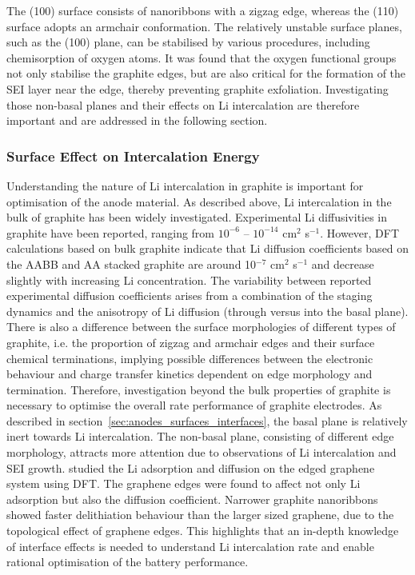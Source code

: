 \documentclass[../main.tex]{subfiles}
\begin{document}
The (100) surface consists of nanoribbons with a zigzag edge, whereas the (110) surface adopts an armchair conformation. The relatively unstable surface planes, such as the (100) plane, can be stabilised by various procedures, including chemisorption of oxygen atoms.\cite{Rosanna} It was found that the oxygen functional groups not only stabilise the graphite edges, but are also critical for the formation of the SEI layer near the edge, thereby preventing graphite exfoliation.\cite{bernardo2015influence} Investigating those non-basal planes and their effects on Li intercalation are therefore important and are addressed in the following section.

\subsubsection{Surface Effect on Intercalation Energy} 
Understanding the nature of Li intercalation in graphite is important for optimisation of the anode material. As described above, Li intercalation in the bulk of graphite has been widely investigated.\cite{persson2010,toyoura2008first,toyoura2010effects,yao2012diffusion,thinius2014theoretical} Experimental Li diffusivities in graphite have been reported, ranging from $10^{-6}$ -- $10^{-14}$ cm$^2$ s$^{-1}$.\cite{toyoura2010effects, takami1995structural, yang2004evaluation,yu1999determination} However, DFT calculations\cite{persson2010} based on bulk graphite indicate that Li diffusion coefficients based on the AABB and AA stacked graphite are around 10$^{-7}$ cm$^2$ s$^{-1}$ and decrease slightly with increasing Li concentration.\cite{persson2010} The variability between reported experimental diffusion coefficients arises from a combination of the staging dynamics and the anisotropy of Li diffusion (through versus into the basal plane). There is also a difference between the surface morphologies of different types of graphite, i.e. the proportion of zigzag and armchair edges and their surface chemical terminations, implying possible differences between the electronic behaviour and charge transfer kinetics dependent on edge morphology and termination. Therefore, investigation beyond the bulk properties of graphite is necessary to optimise the overall rate performance of graphite electrodes. As described in section~\ref{sec:anodes_surfaces_interfaces}, the basal plane is relatively inert towards Li intercalation.\cite{persson2010lithium} The non-basal plane, consisting of different edge morphology, attracts more attention due to observations of Li intercalation and SEI growth.\cite{liu2019situ,zhang2020operando} \citeauthor{uthaisar2010edge} studied the Li adsorption and diffusion on the edged graphene system using DFT.\cite{uthaisar2010edge} The graphene edges were found to affect not only Li adsorption but also the diffusion coefficient. Narrower graphite nanoribbons showed faster delithiation behaviour than the larger sized graphene, due to the topological effect of graphene edges. This highlights that an in-depth knowledge of interface effects is needed to understand Li intercalation rate and enable rational optimisation of the battery performance.
\end{document}
